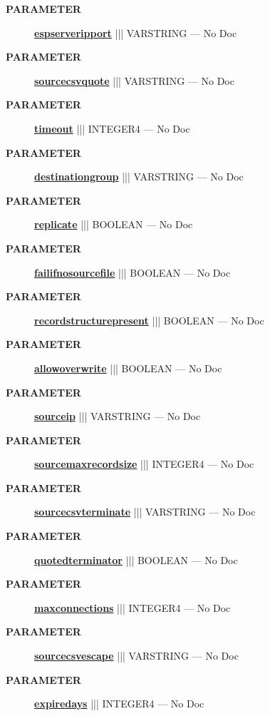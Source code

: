 \par
\begin{description}
\item [\colorbox{tagtype}{\color{white} \textbf{\textsf{PARAMETER}}}] \textbf{\underline{espserveripport}} ||| VARSTRING --- No Doc
\item [\colorbox{tagtype}{\color{white} \textbf{\textsf{PARAMETER}}}] \textbf{\underline{sourcecsvquote}} ||| VARSTRING --- No Doc
\item [\colorbox{tagtype}{\color{white} \textbf{\textsf{PARAMETER}}}] \textbf{\underline{timeout}} ||| INTEGER4 --- No Doc
\item [\colorbox{tagtype}{\color{white} \textbf{\textsf{PARAMETER}}}] \textbf{\underline{destinationgroup}} ||| VARSTRING --- No Doc
\item [\colorbox{tagtype}{\color{white} \textbf{\textsf{PARAMETER}}}] \textbf{\underline{replicate}} ||| BOOLEAN --- No Doc
\item [\colorbox{tagtype}{\color{white} \textbf{\textsf{PARAMETER}}}] \textbf{\underline{failifnosourcefile}} ||| BOOLEAN --- No Doc
\item [\colorbox{tagtype}{\color{white} \textbf{\textsf{PARAMETER}}}] \textbf{\underline{recordstructurepresent}} ||| BOOLEAN --- No Doc
\item [\colorbox{tagtype}{\color{white} \textbf{\textsf{PARAMETER}}}] \textbf{\underline{allowoverwrite}} ||| BOOLEAN --- No Doc
\item [\colorbox{tagtype}{\color{white} \textbf{\textsf{PARAMETER}}}] \textbf{\underline{sourceip}} ||| VARSTRING --- No Doc
\item [\colorbox{tagtype}{\color{white} \textbf{\textsf{PARAMETER}}}] \textbf{\underline{sourcemaxrecordsize}} ||| INTEGER4 --- No Doc
\item [\colorbox{tagtype}{\color{white} \textbf{\textsf{PARAMETER}}}] \textbf{\underline{sourcecsvterminate}} ||| VARSTRING --- No Doc
\item [\colorbox{tagtype}{\color{white} \textbf{\textsf{PARAMETER}}}] \textbf{\underline{quotedterminator}} ||| BOOLEAN --- No Doc
\item [\colorbox{tagtype}{\color{white} \textbf{\textsf{PARAMETER}}}] \textbf{\underline{maxconnections}} ||| INTEGER4 --- No Doc
\item [\colorbox{tagtype}{\color{white} \textbf{\textsf{PARAMETER}}}] \textbf{\underline{sourcecsvescape}} ||| VARSTRING --- No Doc
\item [\colorbox{tagtype}{\color{white} \textbf{\textsf{PARAMETER}}}] \textbf{\underline{expiredays}} ||| INTEGER4 --- No Doc

\end{description}
